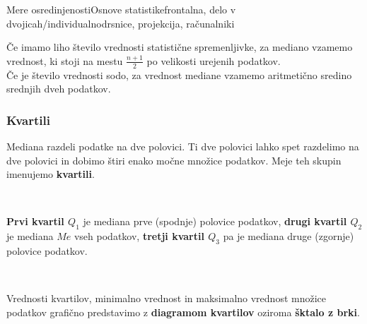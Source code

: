 \begin{priprava}{3}{}{Mere osredinjenosti}{Osnove statistike}{frontalna, delo v dvojicah/individualno}{drsnice, projekcija, računalniki}
            ~
    
        Če imamo liho število vrednosti statistične spremenljivke, za mediano vzamemo vrednost, ki stoji na mestu $\frac{n+1}{2}$ po velikosti urejenih podatkov. \\
        Če je število vrednosti sodo, za vrednost mediane vzamemo aritmetično sredino srednjih dveh podatkov.
    


    \subsubsection{Kvartili}

    
        Mediana razdeli podatke na dve polovici. Ti dve polovici lahko spet razdelimo na dve polovici in dobimo štiri enako močne množice podatkov. 
        Meje teh skupin imenujemo \textbf{kvartili}.
    
            ~


        \textbf{Prvi kvartil $Q_1$} je mediana prve (spodnje) polovice podatkov, \textbf{drugi kvartil $Q_2$} je mediana $Me$ vseh podatkov,
        \textbf{tretji kvartil $Q_3$} pa je mediana druge (zgornje) polovice podatkov.
    
            ~
    
        Vrednosti kvartilov, minimalno vrednost in maksimalno vrednost množice podatkov grafično predstavimo
         z \textbf{diagramom kvartilov} oziroma \textbf{šktalo z brki}. \\~

        \begin{figure}[H]
        \centering
\end{figure}
\end{priprava}
